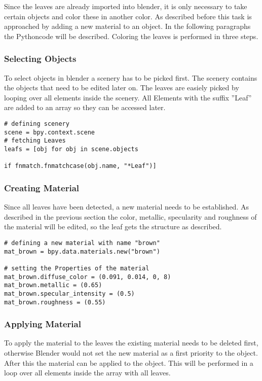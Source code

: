 Since the leaves are already imported into blender, it is only necessary to take certain objects and color these in another color. As described before this task is approached by adding a new material to an object. In the following paragraphs the Pythoncode will be described. \newline
Coloring the leaves is performed in three steps.

\subsubsection*{Selecting Objects}

To select objects in blender a scenery has to be picked first. The scenery contains the objects that need to be edited later on. The leaves are easiely picked by looping over all elements inside the scenery. All Elements with the suffix ''Leaf'' are added to an array so they can be accessed later.\\

\lstset{language=Python, frame=single}
\begin{lstlisting}
# defining scenery
scene = bpy.context.scene
# fetching Leaves
leafs = [obj for obj in scene.objects

if fnmatch.fnmatchcase(obj.name, "*Leaf")]
\end{lstlisting}

\subsubsection*{Creating Material}

Since all leaves have been detected, a new material needs to be established. As described in the previous section the color, metallic, specularity and roughness of the material will be edited, so the leaf gets the structure as described.\\

\lstset{language=Python, frame=single}
\begin{lstlisting}
# defining a new material with name "brown"
mat_brown = bpy.data.materials.new("brown")

# setting the Properties of the material
mat_brown.diffuse_color = (0.091, 0.014, 0, 8)
mat_brown.metallic = (0.65)
mat_brown.specular_intensity = (0.5)
mat_brown.roughness = (0.55)
\end{lstlisting}

\subsubsection*{Applying Material}
To apply the material to the leaves the existing material needs to be deleted first, otherwise Blender would not set the new material as a first priority to the object. After this the material can be applied to the object. This will be performed in a loop over all elements inside the array with all leaves.

